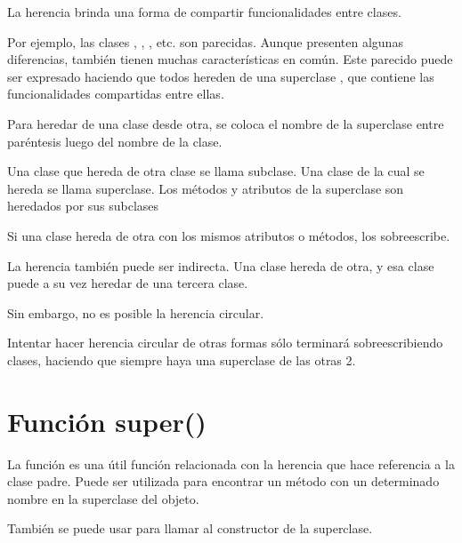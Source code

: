 La herencia brinda una forma de compartir funcionalidades entre clases.\smallskip

Por ejemplo, las clases , , , etc. son parecidas. Aunque presenten algunas diferencias, también tienen muchas características en común. Este parecido puede ser expresado haciendo que todos hereden de una superclase , que contiene las funcionalidades compartidas entre ellas.\smallskip

Para heredar de una clase desde otra, se coloca el nombre de la superclase entre paréntesis luego del nombre de la clase.


Una clase que hereda de otra clase se llama subclase. Una clase de la cual se hereda se llama superclase. Los métodos y atributos de la superclase son heredados por sus subclases\smallskip

Si una clase hereda de otra con los mismos atributos o métodos, los sobreescribe.


La herencia también puede ser indirecta. Una clase hereda de otra, y esa clase puede a su vez heredar de una tercera clase.


Sin embargo, no es posible la herencia circular.


Intentar hacer herencia circular de otras formas sólo terminará sobreescribiendo clases, haciendo que siempre haya una superclase de las otras 2.

\section{Función super()}

La función  es una útil función relacionada con la herencia que hace referencia a la clase padre. Puede ser utilizada para encontrar un método con un determinado nombre en la superclase del objeto.


También se puede usar para llamar al constructor de la superclase.

